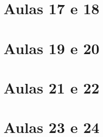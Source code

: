 \begin{apendicesenv}
    \chapter{Aulas 17 e 18} \label{ApendiceJ} 
    \chapter{Aulas 19 e 20} \label{ApendiceK} 
    \chapter{Aulas 21 e 22} \label{ApendiceL} 
    \chapter{Aulas 23 e 24} \label{ApendiceM} 

\end{apendicesenv}
